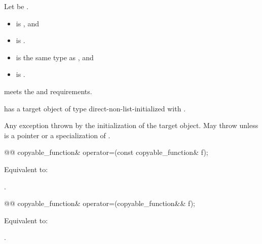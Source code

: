 \begin{itemdescr}
\pnum
Let  be .

\pnum
\constraints
\begin{itemize}
\item
{} is
, and
\item
{} is .
\end{itemize}

\pnum
\mandates
\begin{itemize}
\item
{} is the same type as , and
\item
{} is .
\end{itemize}

\pnum
\expects
{} meets the  and
 requirements.

\pnum
\ensures
{} has a target object of type 
direct-non-list-initialized with
.

\pnum
\throws
Any exception thrown by the initialization of the target object.
May throw  unless  is
a pointer or a specialization of .
\end{itemdescr}

%
\begin{itemdecl}
@@ copyable_function& operator=(const copyable_function& f);
\end{itemdecl}

\begin{itemdescr}
\pnum
\effects
Equivalent to: 

\pnum
\returns
{}.
\end{itemdescr}

%
\begin{itemdecl}
@@ copyable_function& operator=(copyable_function&& f);
\end{itemdecl}

\begin{itemdescr}
\pnum
\effects
Equivalent to: 

\pnum
\returns
{}.
\end{itemdescr}

